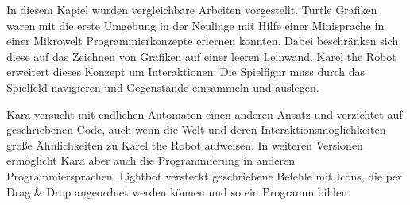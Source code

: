 In diesem Kapiel wurden vergleichbare Arbeiten vorgestellt. Turtle Grafiken waren mit die erste Umgebung in der Neulinge mit Hilfe einer Minisprache in einer Mikrowelt Programmierkonzepte erlernen konnten. Dabei beschränken sich diese auf das Zeichnen von Grafiken auf einer leeren Leinwand. Karel the Robot erweitert dieses Konzept um Interaktionen: Die Spielfigur muss durch das Spielfeld navigieren und Gegenstände einsammeln und auslegen.

Kara versucht mit endlichen Automaten einen anderen Ansatz und verzichtet auf geschriebenen Code, auch wenn die Welt und deren Interaktionsmöglichkeiten große Ähnlichkeiten zu Karel the Robot aufweisen. In weiteren Versionen ermöglicht Kara aber auch die Programmierung in anderen Programmiersprachen. Lightbot versteckt  geschriebene Befehle mit Icons, die per Drag \& Drop angeordnet werden können und so ein Programm bilden.
